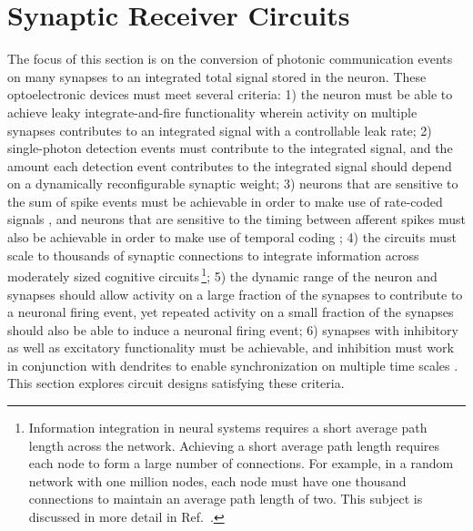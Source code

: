 \documentclass[twocolumn]{article}
\newcommand{\onlinecite}[1]{\hspace{-1 ex} \nocite{#1}\citenum{#1}}
\begin{document}
\section{\label{sec:receiverCircuits}Synaptic Receiver Circuits}
The focus of this section is on the conversion of photonic communication events on many synapses to an integrated total signal stored in the neuron. These optoelectronic devices must meet several criteria: 1) the neuron must be able to achieve leaky integrate-and-fire functionality \cite{daab2001,geki2002} wherein activity on multiple synapses contributes to an integrated signal with a controllable leak rate; 2) single-photon detection events must contribute to the integrated signal, and the amount each detection event contributes to the integrated signal should depend on a dynamically reconfigurable synaptic weight; 3) neurons that are sensitive to the sum of spike events must be achievable in order to make use of rate-coded signals \cite{st1967}, and neurons that are sensitive to the timing between afferent spikes must also be achievable in order to make use of temporal coding \cite{thde2001,geki2002,sase2001,stgo2005}; 4) the circuits must scale to thousands of synaptic connections to integrate information across moderately sized cognitive circuits\,\footnote{Information integration in neural systems requires a short average path length across the network. Achieving a short average path length requires each node to form a large number of connections. For example, in a random network with one million nodes, each node must have one thousand connections to maintain an average path length of two. This subject is discussed in more detail in Ref.\,\onlinecite{shICRC2018}.}; 5) the dynamic range of the neuron and synapses should allow activity on a large fraction of the synapses to contribute to a neuronal firing event, yet repeated activity on a small fraction of the synapses should also be able to induce a neuronal firing event; 6) synapses with inhibitory as well as excitatory functionality must be achievable, and inhibition must work in conjunction with dendrites \cite{budr2004,bu2006,haah2015} to enable synchronization on multiple time scales \cite{sase2001,enfr2001,vala2001,budr2004,robu2015}. This section explores circuit designs satisfying these criteria. 
	
\end{document}
